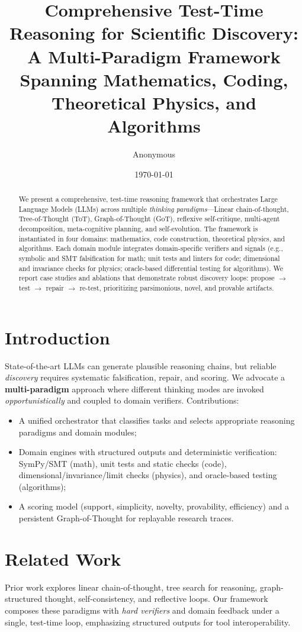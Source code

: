 \documentclass[11pt]{article}
\title{Comprehensive Test-Time Reasoning for Scientific Discovery:\\
A Multi-Paradigm Framework Spanning Mathematics, Coding, Theoretical Physics, and Algorithms}
\author{Anonymous}
\date{\today}
\begin{document}
\maketitle

\begin{abstract}
We present a comprehensive, test-time reasoning framework that orchestrates
Large Language Models (LLMs) across multiple \emph{thinking paradigms}---Linear chain-of-thought,
Tree-of-Thought (ToT), Graph-of-Thought (GoT), reflexive self-critique,
multi-agent decomposition, meta-cognitive planning, and self-evolution.
The framework is instantiated in four domains: mathematics, code construction,
theoretical physics, and algorithms. Each domain module integrates domain-specific
verifiers and signals (e.g., symbolic and SMT falsification for math; unit tests and
linters for code; dimensional and invariance checks for physics; oracle-based
differential testing for algorithms). We report case studies and ablations that
demonstrate robust discovery loops: propose $\rightarrow$ test $\rightarrow$ repair
$\rightarrow$ re-test, prioritizing parsimonious, novel, and provable artifacts.
\end{abstract}

\section{Introduction}
State-of-the-art LLMs can generate plausible reasoning chains, but reliable
\emph{discovery} requires systematic falsification, repair, and scoring.
We advocate a \textbf{multi-paradigm} approach where different thinking modes
are invoked \emph{opportunistically} and coupled to domain verifiers.
Contributions:
\begin{itemize}
  \item A unified orchestrator that classifies tasks and selects appropriate
        reasoning paradigms and domain modules;
  \item Domain engines with structured outputs and deterministic verification:
        SymPy/SMT (math), unit tests and static checks (code),
        dimensional/invariance/limit checks (physics), and oracle-based testing (algorithms);
  \item A scoring model (support, simplicity, novelty, provability, efficiency) and
        a persistent Graph-of-Thought for replayable research traces.
\end{itemize}

\section{Related Work}
Prior work explores linear chain-of-thought, tree search for reasoning,
graph-structured thought, self-consistency, and reflective loops.
Our framework composes these paradigms with \emph{hard verifiers} and
domain feedback under a single, test-time loop, emphasizing structured outputs
for tool interoperability.
\end{document}
